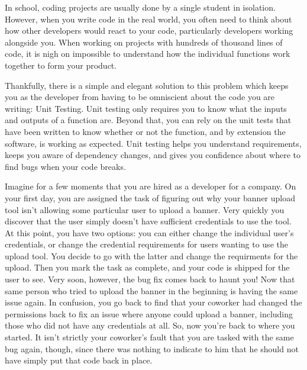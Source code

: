 

In school, coding projects are usually done by a single student in isolation.  However, when you write code in the real world, you often need to think about how other developers would react to your code, particularly developers working alongside you.
When working on projects with hundreds of thousand lines of code, it is nigh on impossible to understand how the individual functions work together to form your product.

Thankfully, there is a simple and elegant solution to this problem which keeps you as the developer from having to be omniscient about the code you are writing: Unit Testing.
Unit testing only requires you to know what the inputs and outputs of a function are.
Beyond that, you can rely on the unit tests that have been written to know whether or not the function, and by extension the software, is working as expected.
Unit testing helps you understand requirements, keeps you aware of dependency changes, and gives you confidence about where to find bugs when your code breaks.

Imagine for a few moments that you are hired as a developer for a company. On your first day, you are assigned the task of figuring out why your banner upload tool isn't allowing some particular user to upload a banner.
Very quickly you discover that the user simply doesn't have sufficient credentials to use the tool. At this point, you have two options: you can either change the individual user's credentials, or change the credential requirements for users wanting to use the upload tool.
You decide to go with the latter and change the requirments for the upload. Then you mark the task as complete, and your code is shipped for the user to see.
Very soon, however, the bug fix comes back to haunt you! Now that same person who tried to upload the banner in the beginning is having the same issue again.
In confusion, you go back to find that your coworker had changed the permissions back to fix an issue where anyone could upload a banner, including those who did not have any credentials at all.
So, now you're back to where you started.  It isn't strictly your coworker's fault that you are tasked with the same bug again, though, since there was nothing to indicate to him that he should not have simply put that code back in place.

